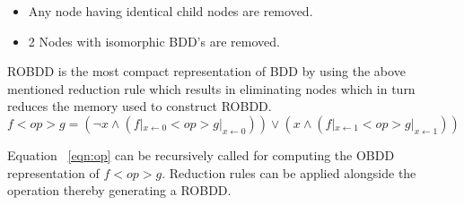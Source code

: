 \begin{itemize}
\item Any node having identical child nodes are removed.
\item 2 Nodes with isomorphic BDD's are removed.
\end{itemize}

ROBDD is the most compact representation of BDD by using the above mentioned reduction rule which results in eliminating nodes which in turn reduces the memory used to construct ROBDD. 
\begin{equation}
f<op>g = (\neg x \land (f|_{x\leftarrow 0} <op> g|_{x\leftarrow 0})) \lor (x \land (f|_{x\leftarrow 1} <op> g|_{x\leftarrow 1}))
\label{eqn:op}
\end{equation}

Equation ~\ref{eqn:op} can be recursively called for computing the OBDD representation of $f<op>g$. Reduction rules can be applied alongside the operation thereby generating a ROBDD.